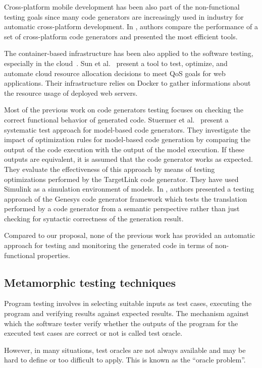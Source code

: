 Cross-platform mobile development has been also part of the non-functional testing goals since many code generators are increasingly used in industry for automatic cross-platform development. In \cite{pazirandeh2015evaluation,hartmann2011cross}, authors compare the performance of a set of cross-platform code generators and presented the most efficient tools.

The container-based infrastructure has been also applied to the software testing, especially in the cloud~\cite{li2015rest}. Sun et al.~\cite{sun2016roar} present a tool to test, optimize, and automate cloud resource allocation decisions to meet QoS goals for web applications. Their infrastructure relies on Docker to gather informations about the resource usage of deployed web servers. 

Most of the previous work on code generators testing focuses on checking the correct functional behavior of generated code. Stuermer et al.~\cite{stuermer2007systematic} present a systematic test approach for model-based code generators. They investigate the impact of optimization rules for model-based code generation by comparing the output of the code execution with the output of the model execution. 
If these outputs are equivalent, it is assumed that the code generator works as expected. 
They evaluate the effectiveness of this approach by means of testing optimizations performed by the TargetLink code generator. 
They have used Simulink as a simulation environment of models. 
In \cite{jorges2014back}, authors presented a testing approach of the Genesys code generator framework which tests the translation performed by a code generator from a semantic perspective rather than just checking for syntactic correctness of the generation result.

Compared to our proposal, none of the previous work has provided an automatic approach for testing and monitoring the generated code in terms of non-functional properties. 

\subsection{Metamorphic testing techniques}
Program testing involves in selecting suitable inputs as test cases, executing the program and verifying results against expected results. The mechanism against which the software tester verify whether the outputs of the program for the executed test cases are correct or not is called test oracle. 

However, in many situations, test oracles are not always available and may be hard to define or too difficult to apply\cite{barr2015oracle}. This is known as the “oracle problem”.


